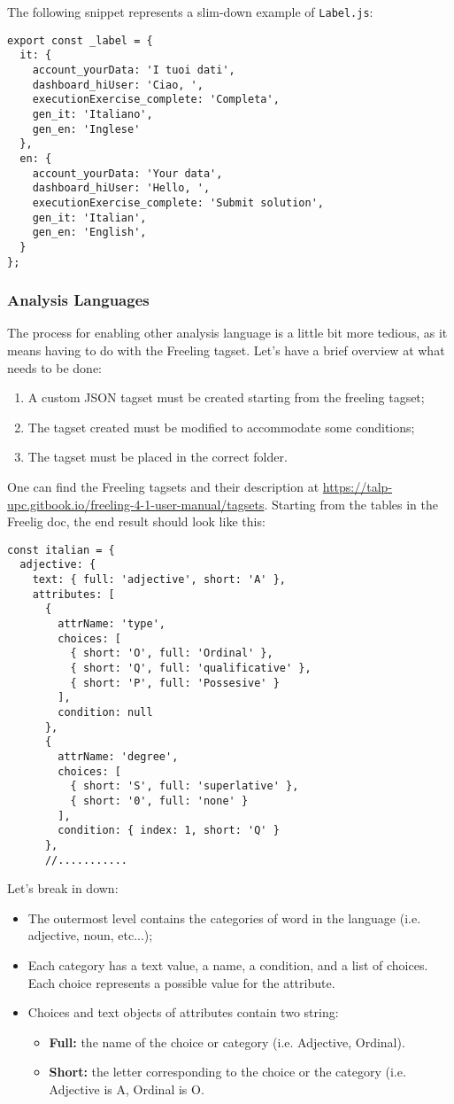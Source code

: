The following snippet represents a slim-down example of \texttt{Label.js}:
\begin{lstlisting}
export const _label = {
  it: {
    account_yourData: 'I tuoi dati',
    dashboard_hiUser: 'Ciao, ',
    executionExercise_complete: 'Completa',
    gen_it: 'Italiano',
    gen_en: 'Inglese'
  },
  en: {
    account_yourData: 'Your data',
    dashboard_hiUser: 'Hello, ',
    executionExercise_complete: 'Submit solution',
    gen_it: 'Italian',
    gen_en: 'English',
  }
};
\end{lstlisting}


\subsubsection{Analysis Languages}
The process for enabling other analysis language is a little bit more tedious, as it means having to do with the Freeling tagset.
Let's have a brief overview at what needs to be done:
\begin{enumerate}
\item A custom JSON tagset must be created starting from the freeling tagset;
\item The tagset created must be modified to accommodate some conditions;
\item The tagset must be placed in the correct folder.
\end{enumerate}
One can find the Freeling tagsets and their description at \url{https://talp-upc.gitbook.io/freeling-4-1-user-manual/tagsets}. Starting from the tables in the Freelig doc, the end result should look like this:
\begin{lstlisting}
const italian = {
  adjective: {
    text: { full: 'adjective', short: 'A' },
    attributes: [
      {
        attrName: 'type',
        choices: [
          { short: 'O', full: 'Ordinal' },
          { short: 'Q', full: 'qualificative' },
          { short: 'P', full: 'Possesive' }
        ],
        condition: null
      },
      {
        attrName: 'degree',
        choices: [
          { short: 'S', full: 'superlative' },
          { short: '0', full: 'none' }
        ],
        condition: { index: 1, short: 'Q' }
      },
      //...........
\end{lstlisting}
Let's break in down:
\begin{itemize}
\item The outermost level contains the categories of word in the language (i.e. adjective, noun, etc...);
\item Each category has a text value, a name, a condition, and a list of choices. Each choice represents a possible value for the attribute.
\item Choices and text objects of attributes contain two string:
	\begin{itemize}
	\item \textbf{Full:} the name of the choice or category (i.e. Adjective, Ordinal).
	\item \textbf{Short:} the letter corresponding to the choice or the category (i.e. Adjective is A, Ordinal is O.
	\end{itemize}
\end{itemize}
